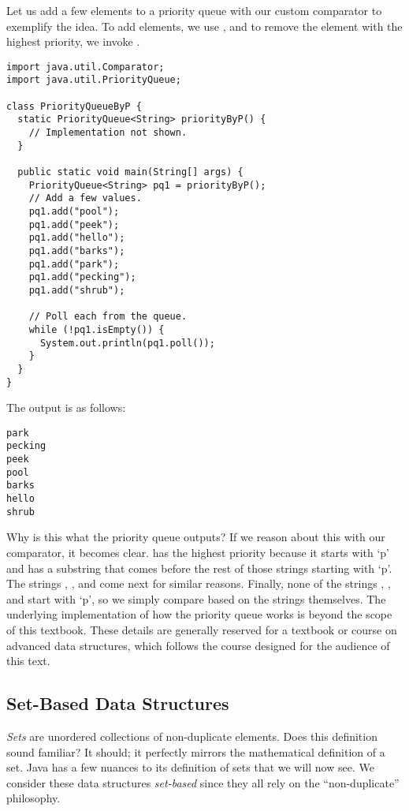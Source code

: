 Let us add a few elements to a priority queue with our custom comparator to exemplify the idea. To add elements, we use , and to remove the element with the highest priority, we invoke .

\begin{cl}[]{}
\begin{lstlisting}[language=MyJava]
import java.util.Comparator;
import java.util.PriorityQueue;

class PriorityQueueByP {
  static PriorityQueue<String> priorityByP() {
    // Implementation not shown.
  }

  public static void main(String[] args) {
    PriorityQueue<String> pq1 = priorityByP();
    // Add a few values.
    pq1.add("pool");
    pq1.add("peek");
    pq1.add("hello");
    pq1.add("barks");
    pq1.add("park");
    pq1.add("pecking");
    pq1.add("shrub");

    // Poll each from the queue.
    while (!pq1.isEmpty()) {
      System.out.println(pq1.poll());
    }
  }
}
\end{lstlisting}
\end{cl}
The output is as follows:
\par{
\begin{verbatim}
park
pecking
peek
pool
barks
hello
shrub
\end{verbatim}
}
Why is this what the priority queue outputs? If we reason about this with our comparator, it becomes clear.  has the highest priority because it starts with `p' and has a substring that comes before the rest of those strings starting with `p'. The strings , , and  come next for similar reasons. Finally, none of the strings , , and  start with `p', so we simply compare based on the strings themselves. The underlying implementation of how the priority queue works is beyond the scope of this textbook. These details are generally reserved for a textbook or course on advanced data structures, which follows the course designed for the audience of this text.

\subsection*{Set-Based Data Structures}
\textit{Sets} are unordered collections of non-duplicate elements. Does this definition sound familiar? It should; it perfectly mirrors the mathematical definition of a set. Java has a few nuances to its definition of sets that we will now see. We consider these data structures \textit{set-based} since they all rely on the ``non-duplicate'' philosophy.

